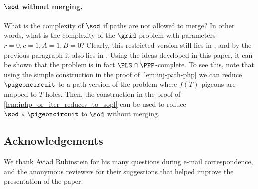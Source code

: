 \paragraph{$\sod$ without merging.}
What is the complexity of $\sod$ if paths are not allowed to merge? In other words, what is the complexity of the $\grid$ problem with parameters $r=0, c=1, A=1, B=0$? Clearly, this restricted version still lies in \PLS, and by the previous paragraph it also lies in \PPP. Using the ideas developed in this paper, it can be shown that the problem is in fact $\PLS\cap\PPP$-complete. To see this, note that using the simple construction in the proof of \cref{lem:inj-path-php} we can reduce $\pigeoncircuit$ to a path-version of the problem where $f(T)$ pigeons are mapped to $T$ holes. Then, the construction in the proof of \cref{lem:iphp_or_iter_reduces_to_sopl} can be used to reduce $\sod \curlywedge \pigeoncircuit$ to $\sod$ without merging.


\bigskip
\subsection*{Acknowledgements}

We thank Aviad Rubinstein for his many questions during e-mail correspondence, and the anonymous reviewers for their suggestions that helped improve the presentation of the paper.

\bigskip

